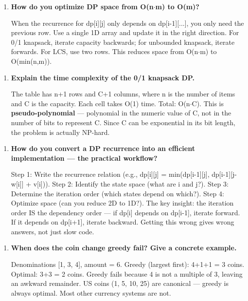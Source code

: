 \begin{enumerate}
\item \textbf{How do you optimize DP space from O(n$\cdot$m) to O(m)?}

When the recurrence for dp[i][j] only depends on dp[i-1][...], you only need the previous row. Use a single 1D array and update it in the right direction. For 0/1 knapsack, iterate capacity backwards; for unbounded knapsack, iterate forwards. For LCS, use two rows. This reduces space from O(n$\cdot$m) to O(min(n,m)).
\end{enumerate}

\begin{enumerate}
\item \textbf{Explain the time complexity of the 0/1 knapsack DP.}

The table has n+1 rows and C+1 columns, where n is the number of items and C is the capacity. Each cell takes O(1) time. Total: O(n$\cdot$C). This is \textbf{pseudo-polynomial} — polynomial in the numeric value of C, not in the number of bits to represent C. Since C can be exponential in its bit length, the problem is actually NP-hard.
\end{enumerate}

\begin{enumerate}
\item \textbf{How do you convert a DP recurrence into an efficient implementation — the practical workflow?}\label{faq:dp-workflow}

Step 1: Write the recurrence relation (e.g., dp[i][j] = min(dp[i-1][j], dp[i-1][j-w[i]] + v[i])). Step 2: Identify the state space (what are i and j?). Step 3: Determine the iteration order (which states depend on which?). Step 4: Optimize space (can you reduce 2D to 1D?). The key insight: the iteration order IS the dependency order — if dp[i] depends on dp[i-1], iterate forward. If it depends on dp[i+1], iterate backward. Getting this wrong gives wrong answers, not just slow code.
\end{enumerate}

\begin{enumerate}
\item \textbf{When does the coin change greedy fail? Give a concrete example.}

Denominations [1, 3, 4], amount = 6. Greedy (largest first): 4+1+1 = 3 coins. Optimal: 3+3 = 2 coins. Greedy fails because 4 is not a multiple of 3, leaving an awkward remainder. US coins (1, 5, 10, 25) are canonical — greedy is always optimal. Most other currency systems are not.
\end{enumerate}

